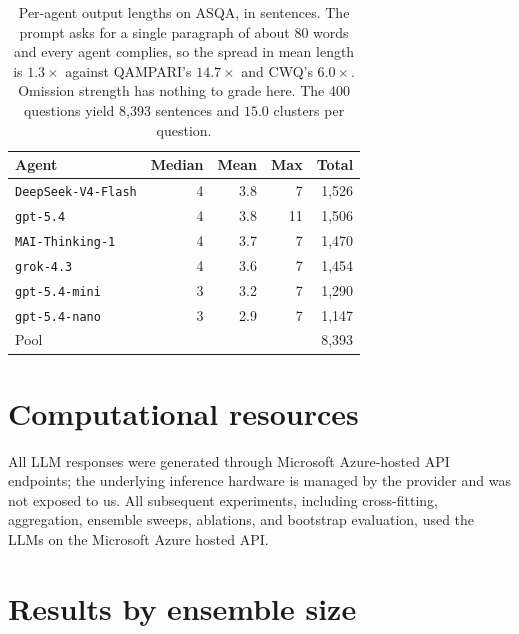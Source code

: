 \documentclass{article}
\begin{document}
\begin{table}[H]
  \caption{Per-agent output lengths on ASQA, in sentences. The prompt asks for a single paragraph of about 80 words and every agent complies, so the spread in mean length is $1.3\times$ against QAMPARI's $14.7\times$ and CWQ's $6.0\times$. Omission strength has nothing to grade here. The 400 questions yield 8,393 sentences and $15.0$ clusters per question.}
  \label{tab:asqa-lengths}
  \centering
  \begin{tabular}{lrrrr}
    \toprule
    Agent & Median & Mean & Max & Total \\
    \midrule
    \texttt{DeepSeek-V4-Flash} & 4 & 3.8 &  7 & 1,526 \\
    \texttt{gpt-5.4}           & 4 & 3.8 & 11 & 1,506 \\
    \texttt{MAI-Thinking-1}    & 4 & 3.7 &  7 & 1,470 \\
    \texttt{grok-4.3}          & 4 & 3.6 &  7 & 1,454 \\
    \texttt{gpt-5.4-mini}      & 3 & 3.2 &  7 & 1,290 \\
    \texttt{gpt-5.4-nano}      & 3 & 2.9 &  7 & 1,147 \\
    \midrule
    Pool                       &   &     &    & 8,393 \\
    \bottomrule
  \end{tabular}
\end{table}

\section{Computational resources}
All LLM responses were generated through Microsoft Azure-hosted API
endpoints; the underlying inference hardware is managed by the provider
and was not exposed to us. All subsequent experiments, including
cross-fitting, aggregation, ensemble sweeps, ablations, and bootstrap
evaluation, used the LLMs on the Microsoft Azure hosted API.

\section{Results by ensemble size}
\label{app:ensembles}
\end{document}
